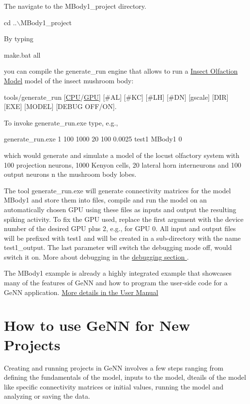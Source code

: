 The navigate to the {\ttfamily M\+Body1\+\_\+project} directory. 
\begin{DoxyCode}
cd ..\(\backslash\)MBody1\_project
\end{DoxyCode}
 By typing 
\begin{DoxyCode}
make.bat all
\end{DoxyCode}
 you can compile the {\ttfamily generate\+\_\+run} engine that allows to run a \hyperlink{Examples_ex_mbody}{Insect Olfaction Model} model of the insect mushroom body\+: 
\begin{DoxyCode}
tools/generate\_run [\hyperlink{modelSpec_8h_ad703205f9a4d4bb6af9c25257c23ce6d}{CPU}/\hyperlink{modelSpec_8h_a39cb9803524b6f3b783344b2f89867b4}{GPU}] [#AL] [#KC] [#LH] [#DN] [gscale] [DIR] [EXE] [MODEL] [DEBUG OFF/ON]. 
\end{DoxyCode}
 To invoke {\ttfamily generate\+\_\+run.\+exe} type, e.\+g., 
\begin{DoxyCode}
generate\_run.exe 1 100 1000 20 100 0.0025 test1 MBody1 0 
\end{DoxyCode}
 which would generate and simulate a model of the locust olfactory system with 100 projection neurons, 1000 Kenyon cells, 20 lateral horn interneurons and 100 output neurons n the mushroom body lobes.

The tool {\ttfamily generate\+\_\+run.\+exe} will generate connectivity matrices for the model {\ttfamily M\+Body1} and store them into files, compile and run the model on an automatically chosen G\+P\+U using these files as inputs and output the resulting spiking activity. To fix the G\+P\+U used, replace the first argument {} with the device number of the desired G\+P\+U plus 2, e.\+g., {} for G\+P\+U 0. All input and output files will be prefixed with {\ttfamily test1} and will be created in a sub-\/directory with the name {\ttfamily test1\+\_\+output}. The last parameter {} will switch the debugging mode off, {} would switch it on. More about debugging in the \hyperlink{}{debugging section }.

The M\+Body1 example is already a highly integrated example that showcases many of the features of Ge\+N\+N and how to program the user-\/side code for a Ge\+N\+N application. \hyperlink{}{More details in the User Manual }\hypertarget{Quickstart_how_to}{}\section{How to use Ge\+N\+N for New Projects}\label{Quickstart_how_to}
Creating and running projects in Ge\+N\+N involves a few steps ranging from defining the fundamentals of the model, inputs to the model, dteails of the model like specific connectivity matrices or initial values, running the model and analyzing or saving the data.

